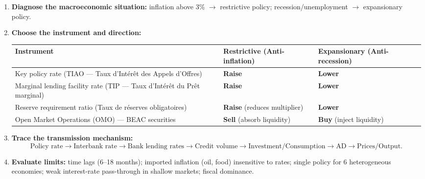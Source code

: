 \documentclass[11pt]{article}
\begin{document}
\begin{methode}
\begin{enumerate}
\item \textbf{Diagnose the macroeconomic situation:} inflation above 3\% $\rightarrow$ restrictive policy; recession/unemployment $\rightarrow$ expansionary policy.
\item \textbf{Choose the instrument and direction:}
\begin{center}
\begin{tabularx}{\linewidth}{|l|X|X|}
\hline
\rowcolor{popblueL} \textbf{Instrument} & \textbf{Restrictive (Anti-inflation)} & \textbf{Expansionary (Anti-recession)} \\
\hline
Key policy rate (TIAO — Taux d'Intérêt des Appels d'Offres) & \textbf{Raise} & \textbf{Lower} \\
Marginal lending facility rate (TIP — Taux d'Intérêt du Prêt marginal) & \textbf{Raise} & \textbf{Lower} \\
Reserve requirement ratio (Taux de réserves obligatoires) & \textbf{Raise} (reduces multiplier) & \textbf{Lower} \\
Open Market Operations (OMO) — BEAC securities & \textbf{Sell} (absorb liquidity) & \textbf{Buy} (inject liquidity) \\
\hline
\end{tabularx}
\end{center}
\item \textbf{Trace the transmission mechanism:}
\[
\text{Policy rate} \rightarrow \text{Interbank rate} \rightarrow \text{Bank lending rates} \rightarrow \text{Credit volume} \rightarrow \text{Investment/Consumption} \rightarrow \text{AD} \rightarrow \text{Prices/Output}.
\]
\item \textbf{Evaluate limits:} time lags (6--18 months); imported inflation (oil, food) insensitive to rates; single policy for 6 heterogeneous economies; weak interest-rate pass-through in shallow markets; fiscal dominance.
\end{enumerate}
\end{methode}
\end{document}
